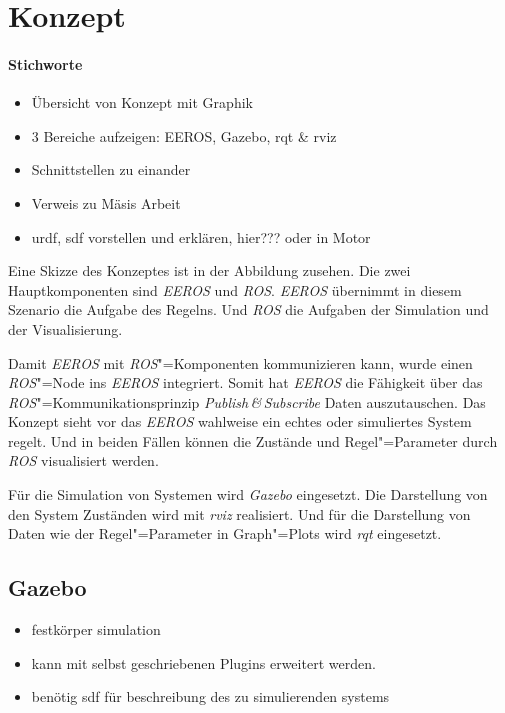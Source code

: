 \chapter{Konzept}
\subsubsection*{Stichworte}
\begin{itemize}
\item Übersicht von Konzept mit Graphik
\item 3 Bereiche aufzeigen: EEROS, Gazebo, rqt \& rviz
\item Schnittstellen zu einander
\item Verweis zu Mäsis Arbeit
\item urdf, sdf vorstellen und erklären, hier??? oder in Motor
\end{itemize}

Eine Skizze des Konzeptes ist in der Abbildung %
zusehen.
Die zwei Hauptkomponenten sind \textit{EEROS} und \textit{ROS}.
\textit{EEROS} übernimmt in diesem Szenario die Aufgabe des Regelns.
Und \textit{ROS} die Aufgaben der Simulation und der Visualisierung.

Damit \textit{EEROS} mit \textit{ROS}"=Komponenten kommunizieren kann, wurde einen \textit{ROS}"=Node ins \textit{EEROS} integriert.
Somit hat \textit{EEROS} die Fähigkeit über das \textit{ROS}"=Kommunikationsprinzip \textit{Publish\,\&\,Subscribe} Daten auszutauschen.
Das Konzept sieht vor das \textit{EEROS} wahlweise ein echtes oder simuliertes System regelt.
Und in beiden Fällen können die Zustände und Regel"=Parameter durch \textit{ROS} visualisiert werden.

Für die Simulation von Systemen wird \textit{Gazebo} eingesetzt.
Die Darstellung von den System Zuständen wird mit \textit{rviz} realisiert. Und für die Darstellung von Daten wie der Regel"=Parameter in Graph"=Plots wird \textit{rqt} eingesetzt.


\section{Gazebo}
\begin{itemize}
\item festkörper simulation
\item kann mit selbst geschriebenen Plugins erweitert werden.
\item benötig sdf für beschreibung des zu simulierenden systems
\end{itemize}

